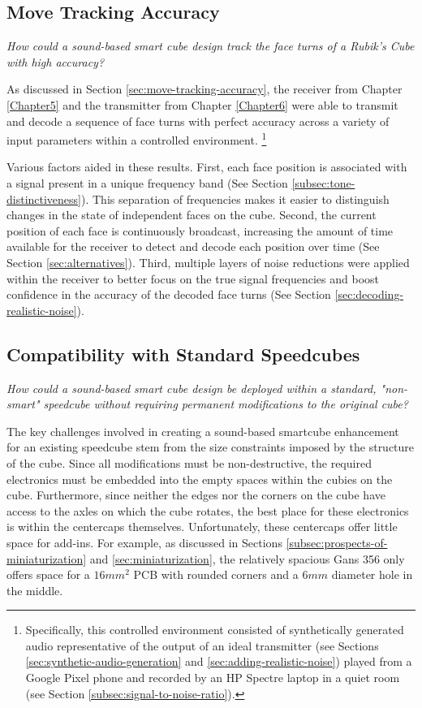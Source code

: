 \subsection{Move Tracking Accuracy}
\label{subsec:answer-accuracy}

\emph{How could a sound-based smart cube design track the face turns of
a Rubik's Cube with high accuracy?}

As discussed in Section \ref{sec:move-tracking-accuracy}, the receiver
from Chapter \ref{Chapter5} and the transmitter from Chapter
\ref{Chapter6} were able to transmit and decode a sequence of face
turns with perfect accuracy across a variety of input parameters within
a controlled environment. \footnote{Specifically, this controlled
environment consisted of synthetically generated audio representative
of the output of an ideal transmitter (see Sections
\ref{sec:synthetic-audio-generation} and
\ref{sec:adding-realistic-noise}) played from a Google Pixel phone and
recorded by an HP Spectre laptop in a quiet room (see Section
\ref{subsec:signal-to-noise-ratio}).}

Various factors aided in these results. First, each face position is
associated with a signal present in a unique frequency band (See
Section \ref{subsec:tone-distinctiveness}). This separation of
frequencies makes it easier to distinguish changes in the state of
independent faces on the cube. Second, the current position of each
face is continuously broadcast, increasing the amount of time available
for the receiver to detect and decode each position over time (See
Section \ref{sec:alternatives}). Third, multiple layers of noise
reductions were applied within the receiver to better focus on the true
signal frequencies and boost confidence in the accuracy of the decoded
face turns (See Section \ref{sec:decoding-realistic-noise}).


\subsection{Compatibility with Standard Speedcubes}
\label{subsec:answer-compatibility}

\emph{How could a sound-based smart cube design be deployed within a
standard, "non-smart" speedcube without requiring permanent
modifications to the original cube?}

The key challenges involved in creating a sound-based smartcube
enhancement for an existing speedcube stem from the size constraints
imposed by the structure of the cube. Since all modifications must be
non-destructive, the required electronics must be embedded into the
empty spaces within the cubies on the cube. Furthermore, since neither
the edges nor the corners on the cube have access to the axles on which
the cube rotates, the best place for these electronics is within the
centercaps themselves. Unfortunately, these centercaps offer little
space for add-ins. For example, as discussed in Sections
\ref{subsec:prospects-of-miniaturization} and
\ref{sec:miniaturization}, the relatively spacious Gans 356 only offers
space for a $16mm^2$ PCB with rounded corners and a $6mm$ diameter hole
in the middle.

